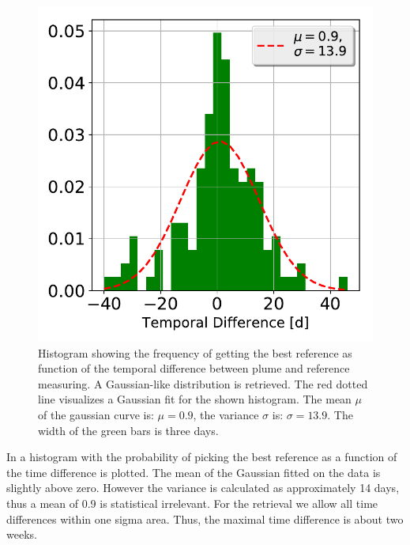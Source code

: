 \begin{figure}
	\centering
	\includegraphics[width=0.6\linewidth]{Bilder/Hist}
	\caption{Histogram showing the frequency of getting the best reference as function of the temporal difference between plume and reference measuring. A Gaussian-like distribution is retrieved. The red dotted line visualizes a Gaussian fit for the shown histogram. The mean $\mu$ of the gaussian curve is: $\mu = 0.9$, the variance $\sigma$ is: $\sigma = 13.9$. The width of the green bars is three days.}
	\label{fig:Hist}
\end{figure}
%
In  a histogram with the probability of picking the best reference as a function of the time difference is plotted. The mean of the Gaussian fitted on the data is slightly above zero. However the variance is calculated as approximately 14 days, thus a mean of 0.9 is statistical irrelevant. For the retrieval we allow all time differences within one sigma area. Thus, the maximal time difference is about two weeks.\\

